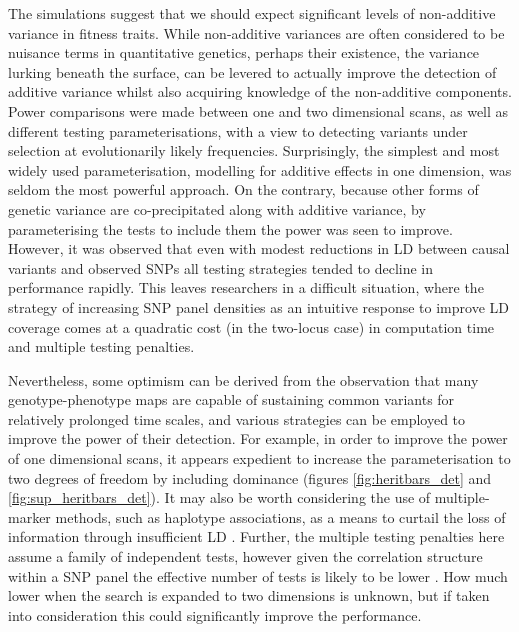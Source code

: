 The simulations suggest that we should expect significant levels of non-additive variance in fitness traits. While non-additive variances are often considered to be nuisance terms in quantitative genetics, perhaps their existence, the variance lurking beneath the surface, can be levered to actually improve the detection of additive variance whilst also acquiring knowledge of the non-additive components. Power comparisons were made between one and two dimensional scans, as well as different testing parameterisations, with a view to detecting variants under selection at evolutionarily likely frequencies. Surprisingly, the simplest and most widely used parameterisation, modelling for additive effects in one dimension, was seldom the most powerful approach. On the contrary, because other forms of genetic variance are co-precipitated along with additive variance, by parameterising the tests to include them the power was seen to improve. However, it was observed that even with modest reductions in LD between causal variants and observed SNPs all testing strategies tended to decline in performance rapidly. This leaves researchers in a difficult situation, where the strategy of increasing SNP panel densities as an intuitive response to improve LD coverage comes at a quadratic cost (in the two-locus case) in computation time and multiple testing penalties.

Nevertheless, some optimism can be derived from the observation that many genotype-phenotype maps are capable of sustaining common variants for relatively prolonged time scales, and various strategies can be employed to improve the power of their detection. For example, in order to improve the power of one dimensional scans, it appears expedient to increase the parameterisation to two degrees of freedom by including dominance (figures \ref{fig:heritbars_det} and \ref{fig:sup_heritbars_det}). It may also be worth considering the use of multiple-marker methods, such as haplotype associations, as a means to curtail the loss of information through insufficient LD \citep{Schaid2004}. Further, the multiple testing penalties here assume a family of independent tests, however given the correlation structure within a SNP panel the effective number of tests is likely to be lower \citep{Dudbridge2008}. How much lower when the search is expanded to two dimensions is unknown, but if taken into consideration this could significantly improve the performance.

